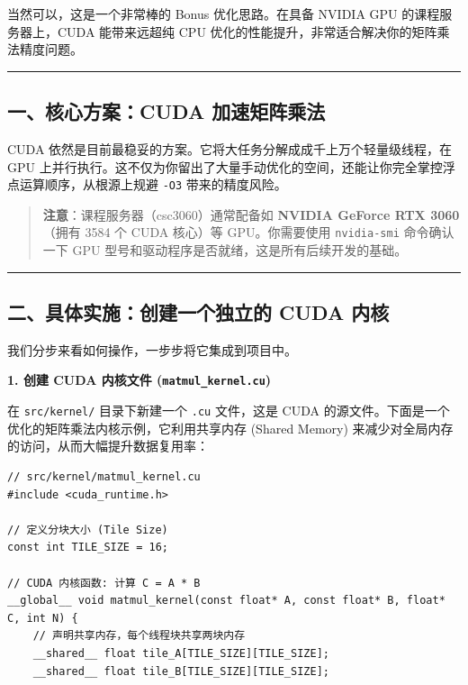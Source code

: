 \documentclass[11pt, a4paper]{article}
\begin{document}
\begin{aibox}
当然可以，这是一个非常棒的 Bonus 优化思路。在具备 NVIDIA GPU 的课程服务器上，CUDA 能带来远超纯 CPU 优化的性能提升，非常适合解决你的矩阵乘法精度问题。

\begin{center}\rule{\textwidth}{0.4pt}\end{center}

\subsection*{一、核心方案：CUDA 加速矩阵乘法}

CUDA 依然是目前最稳妥的方案。它将大任务分解成成千上万个轻量级线程，在 GPU 上并行执行。这不仅为你留出了大量手动优化的空间，还能让你完全掌控浮点运算顺序，从根源上规避 \texttt{-O3} 带来的精度风险。

\begin{quote}
\textbf{注意}：课程服务器（csc3060）通常配备如 \textbf{NVIDIA GeForce RTX 3060}（拥有 3584 个 CUDA 核心）等 GPU。你需要使用 \texttt{nvidia-smi} 命令确认一下 GPU 型号和驱动程序是否就绪，这是所有后续开发的基础。
\end{quote}

\begin{center}\rule{\textwidth}{0.4pt}\end{center}

\subsection*{二、具体实施：创建一个独立的 CUDA 内核}

我们分步来看如何操作，一步步将它集成到项目中。

\vspace{0.5em}
\textbf{1. 创建 CUDA 内核文件 (\texttt{matmul\_kernel.cu})}

在 \texttt{src/kernel/} 目录下新建一个 \texttt{.cu} 文件，这是 CUDA 的源文件。下面是一个优化的矩阵乘法内核示例，它利用共享内存 (Shared Memory) 来减少对全局内存的访问，从而大幅提升数据复用率：

\begin{tcolorbox}[colback=white,colframe=gray!50!white,boxrule=0.5pt,arc=2pt,left=5pt,right=5pt,top=5pt,bottom=5pt]
\begin{verbatim}
// src/kernel/matmul_kernel.cu
#include <cuda_runtime.h>

// 定义分块大小 (Tile Size)
const int TILE_SIZE = 16;

// CUDA 内核函数: 计算 C = A * B
__global__ void matmul_kernel(const float* A, const float* B, float* C, int N) {
    // 声明共享内存，每个线程块共享两块内存
    __shared__ float tile_A[TILE_SIZE][TILE_SIZE];
    __shared__ float tile_B[TILE_SIZE][TILE_SIZE];


\end{verbatim}
\end{tcolorbox}
\end{aibox}
\end{document}
